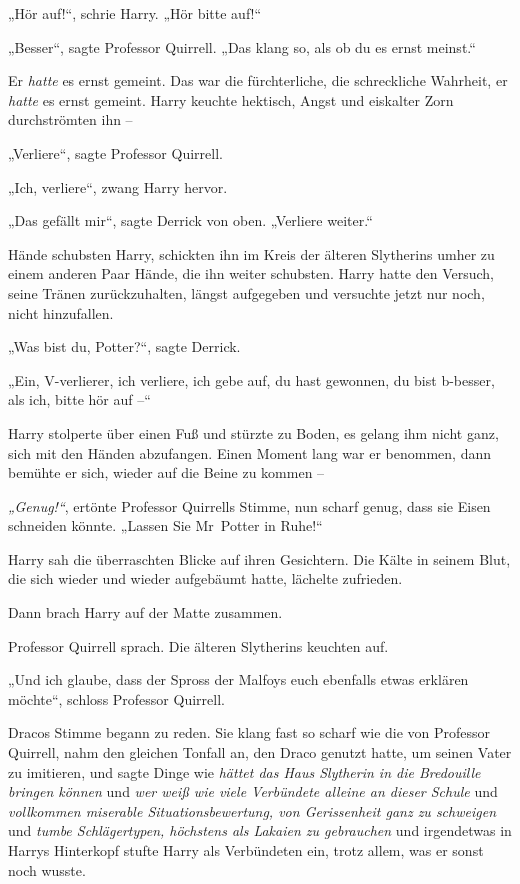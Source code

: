 {„Hör auf!“, schrie Harry. „Hör bitte auf!“

„Besser“, sagte Professor Quirrell. „Das klang so, als ob du es ernst meinst.“

Er \emph{hatte} es ernst gemeint. Das war die fürchterliche, die schreckliche Wahrheit, er \emph{hatte} es ernst gemeint. Harry keuchte hektisch, Angst und eiskalter Zorn durchströmten ihn --

„Verliere“, sagte Professor Quirrell.

„Ich, verliere“, zwang Harry hervor.

„Das gefällt mir“, sagte Derrick von oben. „Verliere weiter.“

\later

Hände schubsten Harry, schickten ihn im Kreis der älteren Slytherins umher zu einem anderen Paar Hände, die ihn weiter schubsten. Harry hatte den Versuch, seine Tränen zurückzuhalten, längst aufgegeben und versuchte jetzt nur noch, nicht hinzufallen.

„Was bist du, Potter?“, sagte Derrick.

„Ein, V-verlierer, ich verliere, ich gebe auf, du hast gewonnen, du bist b-besser, als ich, bitte hör auf --“

Harry stolperte über einen Fuß und stürzte zu Boden, es gelang ihm nicht ganz, sich mit den Händen abzufangen. Einen Moment lang war er benommen, dann bemühte er sich, wieder auf die Beine zu kommen --

\emph{„Genug!“}, ertönte Professor Quirrells Stimme, nun scharf genug, dass sie Eisen schneiden könnte. „Lassen Sie Mr~Potter in Ruhe!“

Harry sah die überraschten Blicke auf ihren Gesichtern. Die Kälte in seinem Blut, die sich wieder und wieder aufgebäumt hatte, lächelte zufrieden.

Dann brach Harry auf der Matte zusammen.

Professor Quirrell sprach. Die älteren Slytherins keuchten auf.

„Und ich glaube, dass der Spross der Malfoys euch ebenfalls etwas erklären möchte“, schloss Professor Quirrell.

Dracos Stimme begann zu reden. Sie klang fast so scharf wie die von Professor Quirrell, nahm den gleichen Tonfall an, den Draco genutzt hatte, um seinen Vater zu imitieren, und sagte Dinge wie \emph{hättet das Haus Slytherin in die Bredouille bringen können} und \emph{wer weiß wie viele Verbündete alleine an dieser Schule} und \emph{vollkommen miserable Situationsbewertung, von Gerissenheit ganz zu schweigen} und \emph{tumbe Schlägertypen, höchstens als Lakaien zu gebrauchen} und irgendetwas in Harrys Hinterkopf stufte Harry als Verbündeten ein, trotz allem, was er sonst noch wusste.

}
